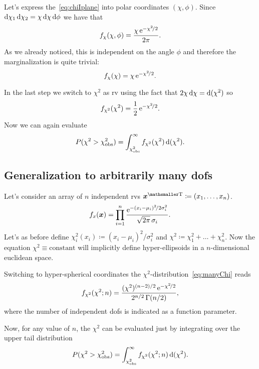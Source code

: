 Let's express the~\eqref{eq:chiIplane} into polar coordinates $(\chi,\phi)$.
Since $\mathop{}\!\mathrm{d}\chi_1\mathop{}\!\mathrm{d}\chi_2 = \chi\mathop{}\!\mathrm{d}\chi\mathop{}\!\mathrm{d}\phi$ we have that
\begin{equation}
	f_\chi(\chi,\phi) = \frac{\chi\,\mathrm{e}^{-\chi^2\!/2}}{2\pi}.
\end{equation}
As we already noticed, this is independent on the angle $\phi$ and therefore the marginalization is quite trivial:
\begin{equation}
	f_\chi(\chi) = \chi\,\mathrm{e}^{-\chi^2\!/2}.
\end{equation}


In the last step we switch to $\chi^2$ as \ac{rv} using the fact that $2\chi\mathop{}\!\mathrm{d}\chi = \mathop{}\!\mathrm{d}(\chi^2)$ so
\begin{equation}
	f_{\chi^2}(\chi^2) = \frac{1}{2}\,\mathrm{e}^{-\chi^2\!/2}.
\end{equation}
Now we can again evaluate
\begin{equation}
	P(\chi^2>\chi^2_\textup{obs}) = \int_{\chi^2_\textup{obs}}^\infty f_{\chi^2}(\chi^2)\mathop{}\!\mathrm{d}(\chi^2).
\end{equation}

\subsection{Generalization to arbitrarily many \acsp{dof}}

Let's consider an array of $n$ independent \acp{rv} $\transpose{\vec{x}}\coloneqq(x_1,\dots,x_n)$.
\begin{equation}\label{eq:manyChi}
	f_x(\bm{{x}}) = \prod_{i=1}^n \frac{\mathrm{e}^{-(x_i-\mu_i)^2\!/2\sigma_i^2}}{\sqrt{2\pi}\,\sigma_i}.
\end{equation}
Let's as before define $\chi^2_i(x_i) \coloneqq (x_i-\mu_i)^2\!/\sigma_i^2$ and $\chi^2 \coloneqq \chi^2_1+\dots+\chi^2_n$.
Now the equation $\chi^2\equiv\text{constant}$ will implicitly define hyper-ellipsoids in a $n$-dimensional euclidean space.


Switching to hyper-spherical coordinates the $\chi^2$-distribution~\eqref{eq:manyChi} reads
\begin{equation}\label{eq:manyChiSphere}
	f_{\chi^2}(\chi^2;n) = \frac{(\chi^2)^{(n-2)/2}\,\mathrm{e}^{-\chi^2\!/2}}{2^{n/2}\,\Gamma(n/2)},
\end{equation}
where the number of independent \acp{dof} is indicated as a function parameter.


Now, for any value of $n$, the $\chi^2$ can be evaluated just by integrating over the upper tail distribution
\begin{equation}
	P(\chi^2>\chi^2_\textup{obs}) = \int_{\chi^2_\textup{obs}}^\infty f_{\chi^2}(\chi^2;n)\mathop{}\!\mathrm{d}(\chi^2).
\end{equation}

